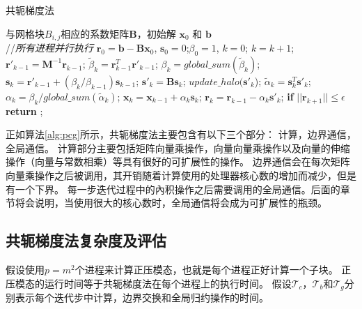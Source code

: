 \begin{algorithm}[h]
\caption{共轭梯度法}
\label{alg:pcg}
\begin{algorithmic}[1]
\REQUIRE  与网格块$B_{i,j}$相应的系数矩阵$\textbf{B}$，初始解 $\textbf{x}_0$ 和 $\textbf{b}$  \\
//\qquad    \textit{所有进程并行执行}
\STATE $\textbf{r}_0 = \textbf{b}-\textbf{B}\textbf{x}_0$, $\textbf{s}_0 =0$;\quad $\beta_0=1$, $k=0$;
\STATE $k=k+1$; 
\STATE $\textbf{r}'_{k-1} =\textbf{M}^{-1}\textbf{r}_{k-1}$;  \label{AlgPcgPrecond}
\STATE $\tilde{\beta}_k = \textbf{r}_{k-1}^T\textbf{r}'_{k-1}$; \label{AlgPcgInner1}
\STATE $\beta_k = global\_sum(\tilde{\beta}_k)$;  \label{AlgPcgGlobal1}
\STATE $\textbf{s}_k = \textbf{r}'_{k-1} +(\beta_k/\beta_{k-1})\textbf{s}_{k-1}$;\label{AlgPcgVec1}
\STATE $\textbf{s}'_k = \textbf{B}\textbf{s}_k$; \label{AlgPcgAx}
\STATE $update\_halo(\textbf{s}'_k$); \label{AlgPcgBound}
\STATE $\tilde{\alpha}_k = \textbf{s}_k^T\textbf{s}'_k$; \label{AlgPcgInner2}
\STATE $\alpha_k =\beta_k/ global\_sum(\tilde{\alpha}_k)$;\quad {}\label{AlgPcgGlobal2}
\STATE $\textbf{x}_k =\textbf{x}_{k-1} +\alpha_k \textbf{s}_k$;\label{AlgPcgVec2}
\STATE $\textbf{r}_k =\textbf{r}_{k-1} -\alpha_k\textbf{s}'_k$;\label{AlgPcgVec3}
\STATE \textbf{if} $||\textbf{r}_{k+1}|| \le \epsilon$  \textbf{return} ;
\ENDIF
\ENDWHILE
\end{algorithmic}
\end{algorithm}

 
正如算法\ref{alg:pcg}所示，共轭梯度法主要包含有以下三个部分： 计算，边界通信，全局通信。
计算部分主要包括矩阵向量乘操作，向量向量乘操作以及向量的伸缩操作（向量与常数相乘）等具有很好的可扩展性的操作。 
边界通信会在每次矩阵向量乘操作之后被调用，其开销随着计算使用的处理器核心数的增加而减少，但是有一个下界。 
每一步迭代过程中的內积操作之后需要调用的全局通信。后面的章节将会说明，当使用很大的核心数时，全局通信将会成为可扩展性的瓶颈。
 

\subsection{共轭梯度法复杂度及评估}
\label{solver:pcgComplex}
假设使用$p=m^2$个进程来计算正压模态，也就是每个进程正好计算一个子块。 
正压模态的运行时间等于共轭梯度法在每个进程上的执行时间。 
假设$\mathcal{T}_c$，$\mathcal{T}_b$和$\mathcal{T}_g$分别表示每个迭代步中计算，边界交换和全局归约操作的时间。


